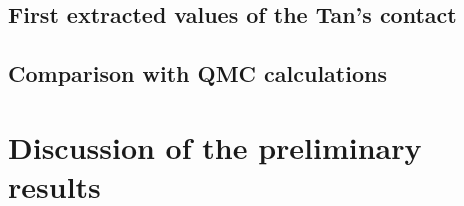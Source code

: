 \subsection{First extracted values of the Tan's contact}

\subsection{Comparison with QMC calculations}

\section{Discussion of the preliminary results}